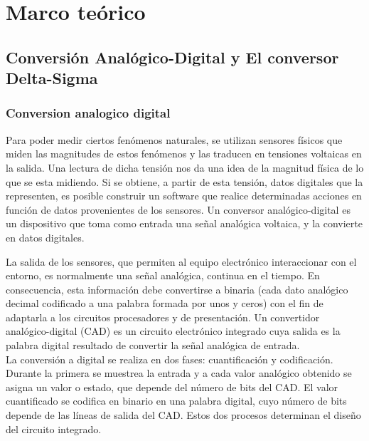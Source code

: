 \chapter{Marco teórico} %
\label{cha:marco_teorico}



\section{Conversión Analógico-Digital y El conversor Delta-Sigma}
\label{sec:conversion_analogica_digital_y_el_conversor_delta_sigma}



\subsection{Conversion analogico digital} %
\label{sub:conversion_analogico_digital}

Para poder medir ciertos fenómenos naturales, se utilizan sensores físicos que miden las magnitudes de estos fenómenos y las traducen en tensiones voltaicas en la salida. Una lectura de dicha tensión nos da una idea de la magnitud física de lo que se esta midiendo. Si se obtiene, a partir de esta tensión, datos digitales que la representen, es posible construir un software que realice determinadas acciones en función de datos provenientes de los sensores. Un conversor analógico-digital es un dispositivo que toma como entrada una señal analógica voltaica, y la convierte en datos digitales.

La salida de los sensores, que permiten al equipo electrónico interaccionar con el entorno, es  normalmente  una  señal  analógica,  continua  en  el tiempo.  En  consecuencia,  esta información  debe  convertirse  a  binaria  (cada  dato  analógico  decimal  codificado  a  una palabra formada por unos y ceros) con el fin de adaptarla a los circuitos procesadores y de presentación. Un convertidor analógico-digital (CAD) es un circuito electrónico integrado cuya salida es la palabra digital resultado de convertir la señal analógica de entrada. \\

La conversión a digital se realiza en dos fases: cuantificación y codificación. Durante la primera se  muestrea la entrada y a  cada valor analógico obtenido se asigna un valor o estado, que depende del número de bits del CAD. El valor cuantificado se codifica en binario en una palabra digital, cuyo número de bits depende de las líneas de salida del CAD. Estos dos procesos determinan el diseño del circuito integrado. \\

